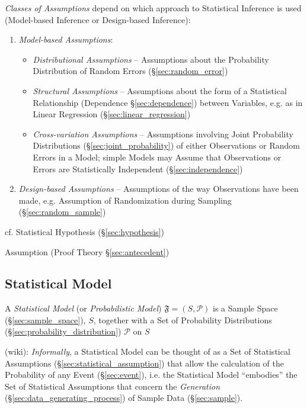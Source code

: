 \emph{Classes of Assumptions} depend on which approach to Statistical Inference
is used (Model-based Inference or Design-based Inference):
\begin{enumerate}
  \item \emph{Model-based Assumptions}:
    \begin{itemize}
      \item \emph{Distributional Assumptions} -- Assumptions about the
        Probability Distribution of Random Errors (\S\ref{sec:random_error})
      \item \emph{Structural Assumptions} -- Assumptions about the form of a
        Statistical Relationship (Dependence \S\ref{sec:dependence}) between
        Variables, e.g. as in Linear Regression (\S\ref{sec:linear_regression})
      \item \emph{Cross-variation Assumptions} -- Assumptions involving Joint
        Probability Distributions (\S\ref{sec:joint_probability}) of either
        Observations or Random Errors in a Model; simple Models may Assume that
        Observations or Errors are Statistically Independent
        (\S\ref{sec:independence})
    \end{itemize}
  \item \emph{Design-based Assumptions} -- Assumptions of the way Observations
    have been made, e.g. Assumption of Randomization during Sampling
    (\S\ref{sec:random_sample})
\end{enumerate}

cf. Statistical Hypothesis (\S\ref{sec:hypothesis})

\fist Assumption (Proof Theory \S\ref{sec:antecedent})



\subsection{Statistical Model}\label{sec:statistical_model}

A \emph{Statistical Model} (or \emph{Probabilistic Model})
$\mathfrak{F} = (S,\mathcal{P})$ is a Sample Space (\S\ref{sec:sample_space}),
$S$, together with a Set of Probability Distributions
(\S\ref{sec:probability_distribution}) $\mathcal{P}$ on $S$

(wiki): \emph{Informally}, a Statistical Model can be thought of as a Set of
Statistical Assumptions (\S\ref{sec:statistical_assumption}) that allow the
calculation of the Probability of any Event (\S\ref{sec:event}), i.e. the
Statistical Model ``embodies'' the Set of Statistical Assumptions that concern
the \emph{Generation} (\S\ref{sec:data_generating_process}) of Sample Data
(\S\ref{sec:sample}).

